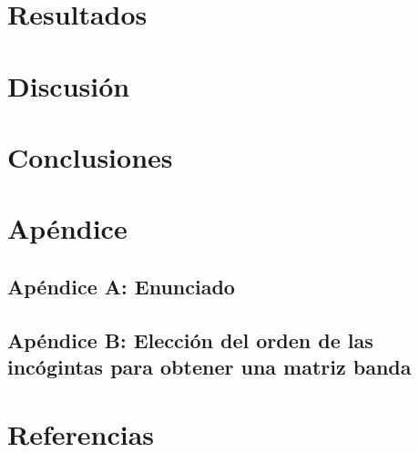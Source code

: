\documentclass[10pt, a4paper, english, spanish]{article}
\begin{document}
\section{Resultados}

\clearpage

\section{Discusión}

\clearpage

\section{Conclusiones}


\section{Apéndice}
\subsection{Apéndice A: Enunciado}\label{enunciado}
% 
\subsection{Apéndice B: Elección del orden de las incógintas para obtener una matriz banda}\label{banda}
% 

\section{Referencias}
\end{document}
